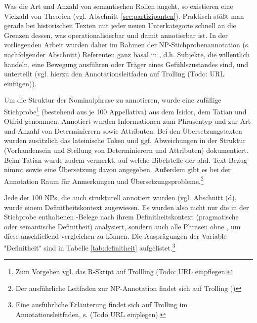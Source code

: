 Was die Art und Anzahl von semantischen Rollen angeht, so  existieren eine Vielzahl von Theorien (vgl. Abschnitt \ref{sec:partizipanten}). Praktisch stößt man gerade bei historischen Texten mit jeder neuen Unterkategorie schnell an die Grenzen dessen, was operationalisierbar und damit annotierbar ist. In der vorliegenden Arbeit wurden daher im Rahmen der NP-Stichprobenannotation (s. nachfolgender Abschnitt) Referenten ganz basal in , d.h. Subjekte, die willentlich handeln,  eine Bewegung ausführen oder Träger eines Gefühlszustandes sind,  und  unterteilt (vgl. hierzu den Annotationsleitfaden auf Trolling (Todo: URL einfügen)). 



Um die Struktur der Nominalphrase zu annotieren, wurde eine zufällige Stichprobe\footnote{Zum Vorgehen vgl. das R-Skript  auf Trollling (Todo: URL einpflegen.} (bestehend aus je 100 Appellativa) aus dem Isidor, dem Tatian und Otfrid genommen. Annotiert wurden Informationen zum Phrasentyp und zur Art und Anzahl von Determinierern sowie Attributen. 
Bei den Übersetzungstexten wurden zusätzlich das lateinische Token und ggf. Abweichungen in der Struktur (Vorhandensein und Stellung von Determinierern und Attributen) dokumentiert. Beim Tatian wurde zudem vermerkt, auf welche Bibelstelle der ahd. Text Bezug nimmt sowie eine Übersetzung davon angegeben. Außerdem gibt es bei der Annotation Raum für Anmerkungen und Übersetzungsprobleme.\footnote{Der ausführliche Leitfaden zur NP-Annotation findet sich auf Trolling ()}  

Jede der 100 NPs, die auch strukturell annotiert wurden (vgl. Abschnitt (d), wurde einem Definitheitskontext zugewiesen. Es wurden also nicht nur die in der Stichprobe enthaltenen -Belege nach ihrem Definitheitskontext (pragmatische oder semantische Definitheit) analysiert, sondern auch alle Phrasen ohne , um diese anschließend vergleichen zu können. Die Ausprägungen der Variable "Definitheit" sind in Tabelle \ref{tab:definitheit} aufgelistet.\footnote{Eine ausführliche Erläuterung findet sich auf Trolling im Annotationsleitfaden, s. (Todo URL einplegen).}

